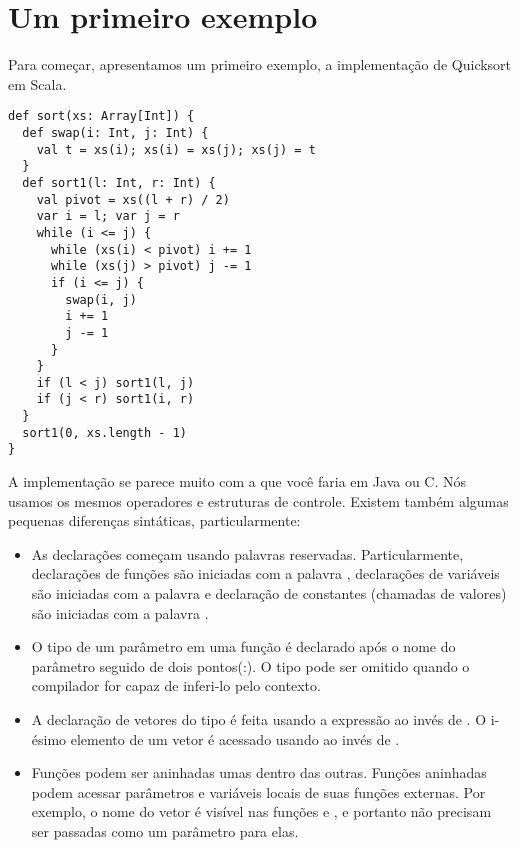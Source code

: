 \def\exercise{
   \def\theresult{Exercício~\thesection.\arabic{result}}
   \refstepcounter{result}
   \trivlist\item[\hskip
   \labelsep{\bf \theresult}]}
\def\endexercise{\endtrivlist}
 
\newcommand{\rewriteby}[1]{\mbox{\tab\tab\rm(#1)}}

\chapter{\label{chap:example-one}Um primeiro exemplo}

Para come\c{c}ar, apresentamos um primeiro exemplo, a implementa\c{c}\~{a}o de Quicksort em Scala.

\begin{lstlisting}
def sort(xs: Array[Int]) {
  def swap(i: Int, j: Int) {
    val t = xs(i); xs(i) = xs(j); xs(j) = t
  }
  def sort1(l: Int, r: Int) {
    val pivot = xs((l + r) / 2)
    var i = l; var j = r
    while (i <= j) {
      while (xs(i) < pivot) i += 1
      while (xs(j) > pivot) j -= 1
      if (i <= j) { 
        swap(i, j)
        i += 1
        j -= 1
      }
    } 
    if (l < j) sort1(l, j)
    if (j < r) sort1(i, r)
  }
  sort1(0, xs.length - 1)
}
\end{lstlisting}

A implementa\c{c}\~{a}o se parece muito com a que voc\^{e} faria em Java
ou C. N\'{o}s usamos os mesmos operadores e estruturas de controle.
Existem tamb\'{e}m algumas pequenas diferen\c{c}as sint\'{a}ticas, particularmente:
\begin{itemize}
\item
As declara\c{c}\~{o}es come\c{c}am usando palavras reservadas. Particularmente, declara\c{c}\~{o}es de fun\c{c}\~{o}es s\~{a}o iniciadas
com a palavra , declara\c{c}\~{o}es de vari\'{a}veis s\~{a}o iniciadas com a palavra  e
declara\c{c}\~{a}o de constantes (chamadas de valores) s\~{a}o iniciadas com a palavra .
\item
O tipo de um par\^{a}metro em uma fun\c{c}\~{a}o \'{e} declarado ap\'{o}s o nome do par\^{a}metro seguido de dois pontos(:).
O tipo pode ser omitido quando o compilador for capaz de inferi-lo pelo contexto.
\item
A  declara\c{c}\~{a}o de vetores do tipo  \'{e} feita usando a express\~{a}o  ao inv\'{e}s de . 
O i-\'{e}simo elemento de um vetor  \'{e} acessado usando  ao inv\'{e}s de .
\item
Fun\c{c}\~{o}es podem ser aninhadas umas dentro das outras. Fun\c{c}\~{o}es aninhadas podem
acessar par\^{a}metros e vari\'{a}veis locais de suas fun\c{c}\~{o}es externas. Por
exemplo, o nome do vetor  \'{e} vis\'{i}vel nas fun\c{c}\~{o}es  e 
, e portanto n\~{a}o precisam ser passadas como um par\^{a}metro para elas.
\end{itemize}

